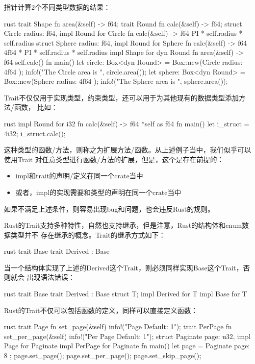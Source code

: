 指针计算2个不同类型数据的结果：
\begin{code-block}{rust}
trait Shape {
    fn area(&self) -> f64;
}
trait Round {
    fn calc(&self) -> f64;
}
struct Circle {
    radius: f64,
}
impl Round for Circle {
    fn calc(&self) -> f64 {
        PI * self.radius * self.radius
    }
}
struct Sphere {
    radius: f64,
}
impl Round for Sphere {
    fn calc(&self) -> f64 {
        4f64 * PI * self.radius * self.radius
    }
}
impl Shape for dyn Round {
    fn area(&self) -> f64 {
        self.calc()
    }
}
fn main() {
    let circle: Box<dyn Round> = Box::new(Circle { radius: 4f64 });
    info!("The Circle area is {}", circle.area());
    let sphere: Box<dyn Round> = Box::new(Sphere { radius: 4f64 });
    info!("The Sphere area is {}", sphere.area());
}
\end{code-block}

Trait不仅仅用于实现类型，约束类型，还可以用于为其他现有的数据类型添加方法/函数，
比如：
\begin{code-block}{rust}
impl Round for i32 {
    fn calc(&self) -> f64 {
        *self as f64
    }
}
fn main() {
    let i_struct = 4i32;
    i_struct.calc();
}
\end{code-block}
这种类型的函数/方法，则称之为扩展方法/函数。从上述例子当中，我们似乎可以使用Trait
对任意类型进行函数/方法的扩展，但是，这个是存在前提的：
\begin{itemize}
  \item impl和trait的声明/定义在同一个crate当中
  \item 或者，impl的实现需要和类型的声明在同一个crate当中
\end{itemize}
如果不满足上述条件，则容易出现bug和问题，也会违反Rust的规则。

Rust的Trait支持多种特性，自然也支持继承，但是注意，Rust的结构体和enum数据类型并不
存在继承的概念。Trait的继承方式如下：
\begin{code-block}{rust}
trait Base {}
trait Derived : Base {}
\end{code-block}
当一个结构体实现了上述的Derived这个Trait，则必须同样实现Base这个Trait，否则就会
出现语法错误：
\begin{code-block}{rust}
trait Base {}
trait Derived : Base {}
struct T;
impl Derived for T {}
impl Base for T {}
\end{code-block}

Rust的Trait不仅可以包括函数的定义，同样可以直接定义函数：
\begin{code-block}{rust}
trait Page {
    fn set_page(&self) {
        info!("Page Default: 1");
    }
}
trait PerPage {
    fn set_per_page(&self) {
        info!("Per Page Default: 1");
    }
}
struct Paginate {
    page: u32,
}
impl Page for Paginate {}
impl PerPage for Paginate {}
fn main() {
    let page = Paginate { page: 8 };
    page.set_page();
    page.set_per_page();
    page.set_skip_page();
}
\end{code-block}

